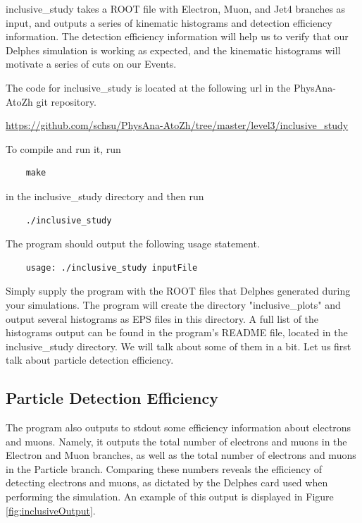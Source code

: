 \documentclass{article}
\begin{document}
inclusive\_study takes a ROOT file with Electron, Muon, and Jet4 branches as input, and outputs a series of kinematic
histograms and detection efficiency information. The detection efficiency information will help us to verify that
our Delphes simulation is working as expected, and the kinematic histograms will motivate a series of cuts on our Events.

\bigskip

The code for inclusive\_study is located at the following url in the PhysAna-AtoZh git repository.

\bigskip

\url{https://github.com/schsu/PhysAna-AtoZh/tree/master/level3/inclusive_study}

\bigskip

To compile and run it, run

\begin{verbatim}
	make
\end{verbatim} 

in the inclusive\_study directory and then run

\begin{verbatim}
	./inclusive_study
\end{verbatim}

The program should output the following usage statement.

\begin{verbatim}
	usage: ./inclusive_study inputFile
\end{verbatim}

Simply supply the program with the ROOT files that Delphes generated during your simulations.
The program will create the directory "inclusive\_plots" and output several histograms as EPS files in this directory.
A full list of the histograms output can be found in the program's README file, located in the inclusive\_study directory.
We will talk about some of them in a bit. Let us first talk about particle detection efficiency.

\subsection{Particle Detection Efficiency}

The program also outputs to stdout some efficiency information about electrons and muons. Namely, it outputs the total
number of electrons and muons in the Electron and Muon branches, as well as the total number of electrons and muons in
the Particle branch. Comparing these numbers reveals the efficiency of detecting electrons and muons, as dictated by
the Delphes card used when performing the simulation. An example of this output is displayed in Figure \ref{fig:inclusiveOutput}.
\end{document}
